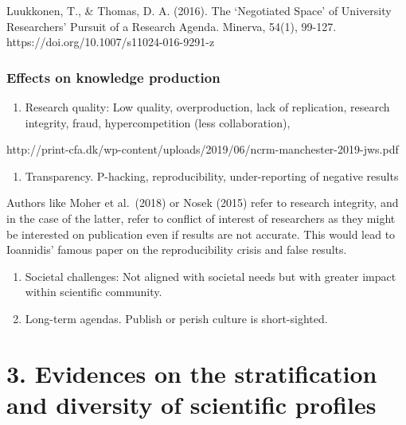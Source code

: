 \documentclass[]{elsarticle} %
\providecommand{\tightlist}{%
  \setlength{\itemsep}{0pt}\setlength{\parskip}{0pt}}
\begin{document}
Luukkonen, T., \& Thomas, D. A. (2016). The `Negotiated Space' of
University Researchers' Pursuit of a Research Agenda. Minerva, 54(1),
99-127. https://doi.org/10.1007/s11024-016-9291-z

\hypertarget{effects-on-knowledge-production}{%
\subsubsection{Effects on knowledge
production}\label{effects-on-knowledge-production}}

\begin{enumerate}
\def\labelenumi{\arabic{enumi}.}
\tightlist
\item
  Research quality: Low quality, overproduction, lack of replication,
  research integrity, fraud, hypercompetition (less collaboration),
\end{enumerate}

http://print-cfa.dk/wp-content/uploads/2019/06/ncrm-manchester-2019-jws.pdf

\begin{enumerate}
\def\labelenumi{\arabic{enumi}.}
\setcounter{enumi}{1}
\tightlist
\item
  Transparency. P-hacking, reproducibility, under-reporting of negative
  results
\end{enumerate}

Authors like Moher et al.~(2018) or Nosek (2015) refer to research
integrity, and in the case of the latter, refer to conflict of interest
of researchers as they might be interested on publication even if
results are not accurate. This would lead to Ioannidis' famous paper on
the reproducibility crisis and false results.

\begin{enumerate}
\def\labelenumi{\arabic{enumi}.}
\setcounter{enumi}{2}
\item
  Societal challenges: Not aligned with societal needs but with greater
  impact within scientific community.
\item
  Long-term agendas. Publish or perish culture is short-sighted.
\end{enumerate}

\hypertarget{evidences-on-the-stratification-and-diversity-of-scientific-profiles}{%
\section{3. Evidences on the stratification and diversity of scientific
profiles}\label{evidences-on-the-stratification-and-diversity-of-scientific-profiles}}
\end{document}
